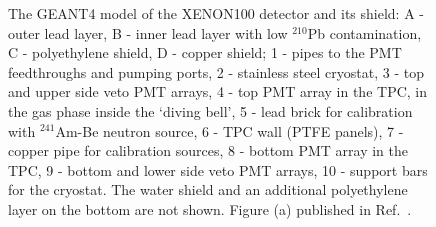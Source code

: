 \begin{figure}[!ht]
\centering
{}
\caption[The GEANT4 model of the XENON100 detector and its shield]{The GEANT4 model of the XENON100 detector and its shield: A - outer lead layer, B - inner lead layer with low $^{210}$Pb contamination, C - polyethylene shield, D - copper shield; 1 -  pipes to the PMT feedthroughs and pumping ports, 2 - stainless steel cryostat, 3 - top and upper side veto PMT arrays, 4 - top PMT array in the TPC, in the gas phase inside the `diving bell', 5 - lead brick for calibration with $^{241}$Am-Be neutron source, 6 - TPC wall (PTFE panels), 7 - copper pipe for calibration sources, 8 - bottom PMT array in the TPC, 9 - bottom and lower side veto PMT arrays, 10 - support bars for the cryostat. 
The water shield and an additional polyethylene layer on the bottom are not shown. Figure (a) published in Ref.~\cite{EMBG}.}
\label{figDetectorModel}
\end{figure}


